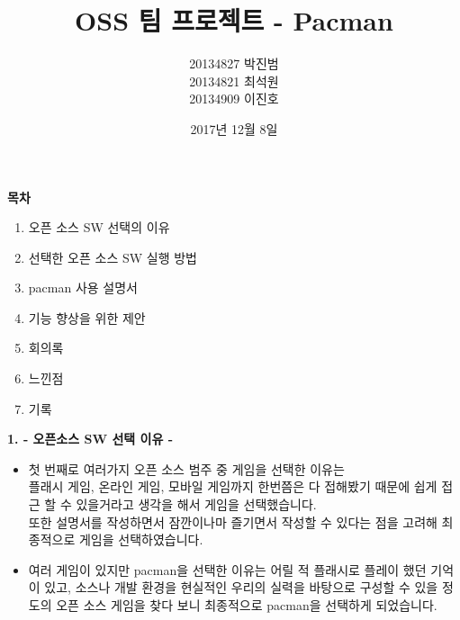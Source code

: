 \documentclass{article}
\begin{document}
 
\title{\textbf{OSS 팀 프로젝트 - Pacman}}
\author {20134827 박진범\\20134821 최석원\\20134909 이진호}
\date{2017년 12월 8일}
\maketitle
 
 
 
\newpage
\begin{huge}\begin{center}\textbf{목차\\}\end{center}\end{huge}
 
\begin{enumerate}
 
\item 오픈 소스 SW 선택의 이유
\item 선택한 오픈 소스 SW 실행 방법
\item pacman 사용 설명서
\item 기능 향상을 위한 제안
\item 회의록 
\item 느낀점 
\item 기록
 
\end{enumerate}

\newpage

\flushleft
\begin{large}\textbf{1. - 오픈소스 SW 선택 이유 -}\end{large}
\begin{itemize}
 
\item 첫 번째로 여러가지 오픈 소스 범주 중 게임을 선택한 이유는\\ 
플래시 게임, 온라인 게임, 모바일 게임까지 한번쯤은 다 접해봤기 때문에 쉽게 접근 할 수 있을거라고 생각을 해서 게임을 선택했습니다. \\
또한 설명서를 작성하면서 잠깐이나마 즐기면서 작성할 수 있다는 점을 고려해 최종적으로 게임을 선택하였습니다.\\


\item 여러 게임이 있지만 pacman을 선택한 이유는 어릴 적 플래시로 플레이 했던 기억이 있고, 소스나 개발 환경을 현실적인 우리의 실력을 바탕으로 구성할 수 있을 정도의 오픈 소스 게임을 찾다 보니 최종적으로 pacman을 선택하게 되었습니다.\\
 
\end{itemize}
\end{document}
